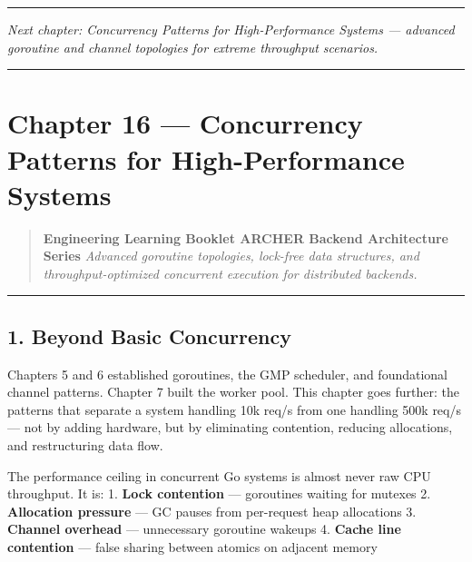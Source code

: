 \documentclass[
]{article}
\begin{document}
\begin{center}\rule{0.5\linewidth}{0.5pt}\end{center}

\emph{Next chapter: Concurrency Patterns for High-Performance Systems
--- advanced goroutine and channel topologies for extreme throughput
scenarios.}

\begin{center}\rule{0.5\linewidth}{0.5pt}\end{center}

\hypertarget{chapter-16-concurrency-patterns-for-high-performance-systems}{%
\section{Chapter 16 --- Concurrency Patterns for High-Performance
Systems}\label{chapter-16-concurrency-patterns-for-high-performance-systems}}

\begin{quote}
\textbf{Engineering Learning Booklet \textbar{} ARCHER Backend
Architecture Series} \emph{Advanced goroutine topologies, lock-free data
structures, and throughput-optimized concurrent execution for
distributed backends.}
\end{quote}

\begin{center}\rule{0.5\linewidth}{0.5pt}\end{center}

\hypertarget{beyond-basic-concurrency}{%
\subsection{1. Beyond Basic
Concurrency}\label{beyond-basic-concurrency}}

Chapters 5 and 6 established goroutines, the GMP scheduler, and
foundational channel patterns. Chapter 7 built the worker pool. This
chapter goes further: the patterns that separate a system handling 10k
req/s from one handling 500k req/s --- not by adding hardware, but by
eliminating contention, reducing allocations, and restructuring data
flow.

The performance ceiling in concurrent Go systems is almost never raw CPU
throughput. It is: 1. \textbf{Lock contention} --- goroutines waiting
for mutexes 2. \textbf{Allocation pressure} --- GC pauses from
per-request heap allocations 3. \textbf{Channel overhead} ---
unnecessary goroutine wakeups 4. \textbf{Cache line contention} ---
false sharing between atomics on adjacent memory
\end{document}
